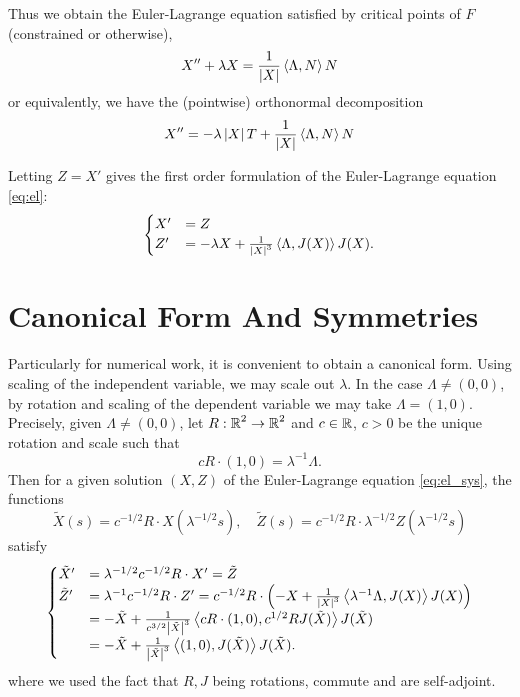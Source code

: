 \documentclass[12pt]{article}
\begin{document}
Thus we obtain the Euler-Lagrange equation satisfied by critical points of \(F\) (constrained or otherwise),
\begin{equation}
\label{eq:el}
X'' + \lambda X = \frac{1}{\left|{X}\right|} \left\langle{\Lambda},{N}\right\rangle N
\end{equation}
or equivalently, we have the (pointwise) orthonormal decomposition
\begin{equation}
\label{eq:pointwise_orth}
X'' = -\lambda \left|{X}\right| T + \frac{1}{\left|{X}\right|} \left\langle{\Lambda},{N}\right\rangle N
\end{equation}

Letting \(Z = X'\) gives the first order formulation of the Euler-Lagrange equation \eqref{eq:el}:
\begin{equation}
\label{eq:el_sys}
\begin{cases}
X' &= Z \\
Z' &= -\lambda X + \frac{1}{\left|{X}\right|^3} \left\langle{\Lambda},{J(X)}\right\rangle J(X).
\end{cases}
\end{equation}

\section{Canonical Form And Symmetries}

Particularly for numerical work, it is convenient to obtain a canonical form. Using scaling of the independent variable, we may scale out \(\lambda\). In the case \(\Lambda \ne (0, 0)\), by rotation and scaling of the dependent variable we may take \(\Lambda = (1, 0)\). Precisely, given \(\Lambda \ne (0, 0)\), let \(R : \operatorname{\mathbb{R}}^2 \to \operatorname{\mathbb{R}}^2\) and \(c \in \operatorname{\mathbb{R}}\), \(c > 0\) be the unique rotation and scale such that
\[
c R \cdot (1, 0) = \lambda^{-1} \Lambda.
\]
Then for a given solution \((X, Z)\) of the Euler-Lagrange equation \eqref{eq:el_sys}, the functions
\[
\tilde{X}(s) = c^{-1/2} R \cdot X(\lambda^{-1/2} s), \quad \tilde{Z}(s) = c^{-1/2} R \cdot \lambda^{-1/2} Z(\lambda^{-1/2} s)
\]
satisfy
\begin{equation}
\label{eq:el_sys_can}
\begin{cases}
\tilde{X}' &= \lambda^{-1/2} c^{-1/2} R \cdot X' = \tilde{Z} \\
\tilde{Z}' &= \lambda^{-1} c^{-1/2} R \cdot Z' = c^{-1/2} R \cdot \left(-X + \frac{1}{\left|{X}\right|^3} \left\langle{\lambda^{-1}\Lambda},{J(X)}\right\rangle J(X)\right) \\
&= -\tilde{X} + \frac{1}{c^{3/2}\left|{\tilde{X}}\right|^3} \left\langle{c R \cdot (1, 0)},{c^{1/2} R J(\tilde{X})}\right\rangle J(\tilde{X}) \\
&= -\tilde{X} + \frac{1}{\left|{\tilde{X}}\right|^3} \left\langle{(1, 0)},{J(\tilde{X})}\right\rangle J(\tilde{X}).
\end{cases}
\end{equation}
where we used the fact that \(R, J\) being rotations, commute and are self-adjoint.
\end{document}
